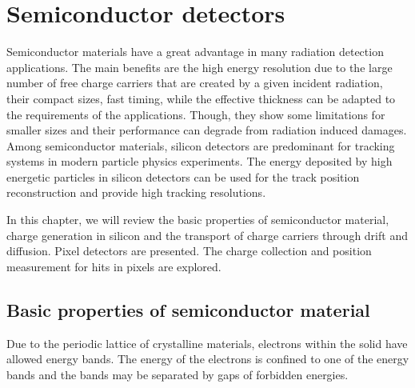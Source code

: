 \chapter{Semiconductor detectors}
\label{sec:SiliconTheory}

Semiconductor materials have a great advantage in many radiation
detection applications. The main benefits are the high energy
resolution due to the large number of free charge carriers that are
created by a given incident radiation, their compact sizes, fast
timing, while the effective thickness can be adapted to the
requirements of the applications. Though, they show some limitations
for smaller sizes and their performance can degrade from radiation
induced damages. Among semiconductor materials, silicon detectors are
predominant for tracking systems in modern particle physics
experiments. The energy deposited by high energetic particles in
silicon detectors can be used for the track position reconstruction
and provide high tracking resolutions.

In this chapter, we will review the basic properties of semiconductor
material, charge generation in silicon and the transport of charge
carriers through drift and diffusion. Pixel detectors are
presented. The charge collection and position measurement for hits in
pixels are explored.

\section{Basic properties of semiconductor material}

Due to the periodic lattice of crystalline materials, electrons within
the solid have allowed energy bands. The energy of the electrons is
confined to one of the energy bands and the bands may be separated by
gaps of forbidden energies.

